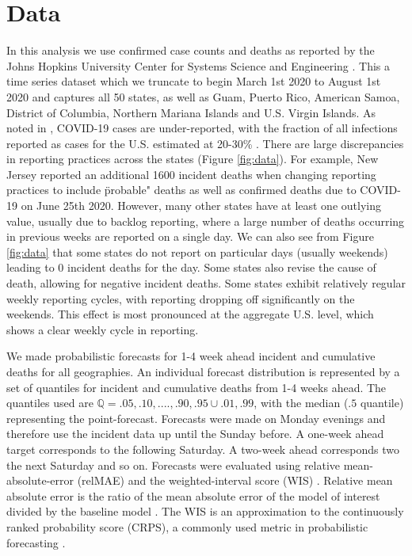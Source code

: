 \documentclass[11pt]{amsart}
\begin{document}
\section{Data}
	In this analysis we use confirmed case counts and deaths as reported by the Johns Hopkins University Center for Systems Science and Engineering \cite{dong2020interactive}. This a time series dataset which we truncate to begin March 1st 2020 to August 1st 2020 and captures all 50 states, as well as Guam, Puerto Rico, American Samoa, District of Columbia, Northern Mariana Islands and U.S. Virgin Islands. As noted in \cite{krantz2020level}, COVID-19 cases are under-reported, with the fraction of all infections reported as cases for the U.S. estimated at 20-30\% \cite{russel2020using}. 
	There are large discrepancies in reporting practices across the states (Figure \ref{fig:data}). For example, New Jersey reported an additional 1600 incident deaths when changing reporting practices to include \"probable" deaths as well as confirmed deaths due to COVID-19 on June 25th 2020. However, many other states have at least one outlying value, usually due to backlog reporting, where a large number of deaths occurring in previous weeks are reported on a single day. We can also see from Figure \ref{fig:data} that some states do not report on particular days (usually weekends) leading to 0 incident deaths for the day. Some states also revise the cause of death, allowing for negative incident deaths.  Some states exhibit relatively regular weekly reporting cycles, with reporting dropping off significantly on the weekends. This effect is most pronounced at the aggregate U.S. level, which shows a clear weekly cycle in reporting. 
	
	
We made probabilistic forecasts  for 1-4 week ahead incident and cumulative deaths for all geographies. An individual forecast distribution is represented by a set of quantiles for incident and cumulative deaths from 1-4 weeks ahead. The quantiles used are $\mathbb{Q} = {.05,.10,....,.90,.95} \cup {.01,.99}$, with the median ($.5$ quantile) representing the point-forecast. Forecasts were made on Monday evenings and therefore use the incident data up until the Sunday before. A one-week ahead target corresponds to the following Saturday. A two-week ahead corresponds two the next Saturday and so on. Forecasts were evaluated using relative mean-absolute-error (relMAE) and the weighted-interval score (WIS) \cite{bracher2020evaluating}. Relative mean absolute error is the ratio of the mean absolute error of the model of interest divided by the baseline model \cite{reich2016case}. The WIS is an approximation to the continuously ranked probability score (CRPS), a commonly used metric in probabilistic forecasting \cite{bracher2019multibin}\cite{reich2019reply}.
\end{document}
